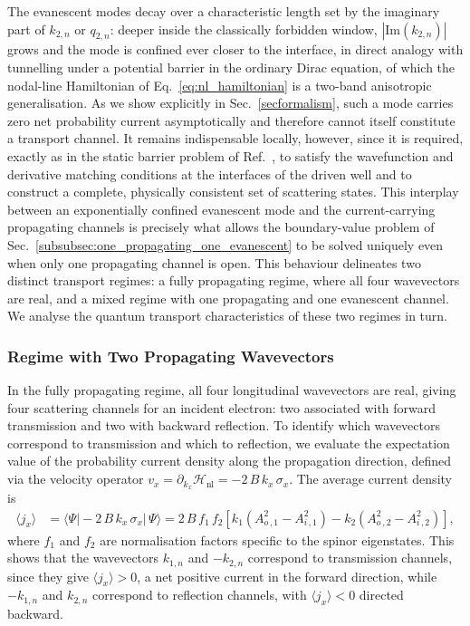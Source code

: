\documentclass[aps,prb,onecolumn,longbibliography,nofootinbib,citeautoscript,10pt]{revtex4-2}
\begin{document}
The evanescent modes decay over a characteristic length set by the imaginary part of $k_{2,n}$ or $q_{2,n}$: deeper inside the classically forbidden window, $|\text{Im}(k_{2,n})|$ grows and the mode is confined ever closer to the interface, in direct analogy with tunnelling under a potential barrier in the ordinary Dirac equation, of which the nodal-line Hamiltonian of Eq.~\eqref{eq:nl_hamiltonian} is a two-band anisotropic generalisation. As we show explicitly in Sec.~\ref{secformalism}, such a mode carries zero net probability current asymptotically and therefore cannot itself constitute a transport channel. It remains indispensable locally, however, since it is required, exactly as in the static barrier problem of Ref.~\cite{Khokhlov2018}, to satisfy the wavefunction and derivative matching conditions at the interfaces of the driven well and to construct a complete, physically consistent set of scattering states. This interplay between an exponentially confined evanescent mode and the current-carrying propagating channels is precisely what allows the boundary-value problem of Sec.~\ref{subsubsec:one_propagating_one_evanescent} to be solved uniquely even when only one propagating channel is open. This behaviour delineates two distinct transport regimes: a fully propagating regime, where all four wavevectors are real, and a mixed regime with one propagating and one evanescent channel. We analyse the quantum transport characteristics of these two regimes in turn.

\subsubsection{Regime with Two Propagating Wavevectors}
\label{subsubsec:two_propagating}

In the fully propagating regime, all four longitudinal wavevectors are real, giving four scattering channels for an incident electron: two associated with forward transmission and two with backward reflection. To identify which wavevectors correspond to transmission and which to reflection, we evaluate the expectation value of the probability current density along the propagation direction, defined via the velocity operator $v_x = \partial_{k_x} \mathcal{H}_{\text{nl}}  = -2 \,B \,k_x  \, \sigma_x$. The average current density is
\begin{align}
\langle j_x \rangle  & =  \Big\langle \Psi \Big| -2 \,B\, k_x \,\sigma_x \Big| 
\, \Psi \Big\rangle 
= 2 \,B\, f_1 \, f_2 \left[ k_1 \left( A_{o \,, 1}^2 - A_{i \,, 1}^2 \right)
- k_2 \left( A_{o \,, 2}^2 - A_{i \,, 2}^2 \right) \right],
\label{eq:current_density}
\end{align}
where $f_1$ and $f_2$ are normalisation factors specific to the spinor eigenstates. This shows that the wavevectors $k_{1,n}$ and $-k_{2,n}$ correspond to transmission channels, since they give $\langle j_x \rangle > 0$, a net positive current in the forward direction, while $-k_{1,n}$ and $k_{2,n}$ correspond to reflection channels, with $\langle j_x \rangle < 0$ directed backward.
\end{document}

